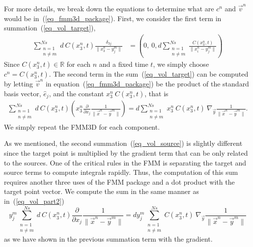 For more details, we break down the equations to determine what are $c^n$ and $\vec{v}^n$ would be in~(\ref{eq_fmm3d_package}).
First, we consider the first term in summation~(\ref{eq_vol_target}),
\begin{align}
	\sum_{\substack{n=1 \\ n \neq m}}^{Ns} 
		d \ {C}(x_3^n, t)
			\frac{ \delta_{3j} }{\|x_3^n - y_j^m \|}
	 & = \left(0,\ 0, d 	\sum_{\substack{n=1 \\ n \neq m}}^{Ns}  \frac{ {C}(x_3^n, t)}{ \|x_i^n - y_j^m \|} \right)
\label{eq_vol_part1}
\end{align}
Since ${C}(x_3^n, t)\in \mathbb{R}$ for each $n$ and a fixed time $t$, we simply choose  $c^n =  {C}(x_3^n, t)$. 
The second term in the sum~(\ref{eq_vol_target}) can be computed by letting $\vec{v}^n$ in equation~(\ref{eq_fmm3d_package}) be the product of the standard basis vector, $\hat{e}_j$, and the constant $x_3^n  \ {C}(x_3^n, t) $, that is
\begin{align}
	\sum_{\substack{n=1 \\ n \neq m}}^{Ns} 
		d \ {C}(x_3^n, t)
		\left(
			 x_3^n  
			\frac{\partial}{\partial x_j}
				\frac{1}{\|\vec{x}^n - \vec{y}^m\|}
				\right) = 
		d \sum_{\substack{n=1 \\ n \neq m}}^{Ns} 
			x_3^n  \ {C}(x_3^n, t) 
			      \
			\nabla_{\vec{y}} 
				\frac{1}{\|\vec{x}^n - \vec{y}^m \|}.
\label{eq_vol_part2}
\end{align}
We simply repeat the FMM3D for each component. 
\par
As we mentioned, the second summation~(\ref{eq_vol_source}) is slightly different since the target point is multiplied by the gradient term that can be only related to the sources. One of the critical rules in the FMM is separating the target and source terms to compute integrals rapidly. Thus, the computation of this sum requires another three uses of the FMM package and a dot product with the target point vector.
We compute the sum in the same manner as in~(\ref{eq_vol_part2})
\begin{equation}
	y_j^m  
	\sum_{\substack{n=1 \\ n \neq m}}^{Ns} 
	d \ {C}(x_3^n, t)
	\frac{\partial}{\partial x_j}
	\frac{1}{\| \vec{x}^n - \vec{y}^m \|} 
	= d y_j^m  
	\sum_{\substack{n=1 \\ n \neq m}}^{Ns}  
	{C}(x_3^n, t) \
	\nabla_{\vec{y}} 
	\frac{1}{\| \vec{x}^n - \vec{y}^m\|}
\end{equation}
as we have shown in the previous summation term with the gradient. 

